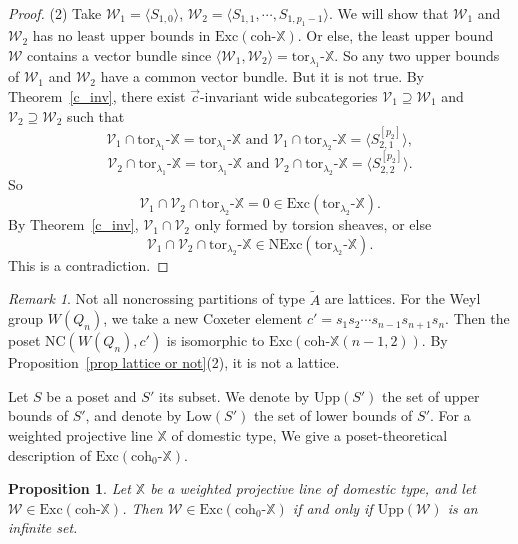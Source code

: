 \documentclass[a4paper, 11pt, reqno]{amsart}
\numberwithin{equation}{section}
\newtheorem{prop}[thm]{Proposition}
\theoremstyle{remark}
\newtheorem{rmk}[thm]{Remark}
\theoremstyle{definition}
\begin{document}
\begin{proof}
   (2) Take $\mathcal W_1=\langle S_{1,0} \rangle$, $\mathcal W_2=\langle S_{1,1},\cdots,S_{1,p_1-1} \rangle$. We will show that $\mathcal W_1$ and $\mathcal W_2$ has no least upper bounds in $\mathrm{Exc}(\mathrm{coh} \text{-} \mathbb X)$. Or else, the least upper bound $\mathcal W$ contains a vector bundle since $\langle \mathcal W_1, \mathcal W_2 \rangle=\mathrm{tor}_{\lambda_1} \text{-} \mathbb X$. So any two upper bounds of $\mathcal W_1$ and $\mathcal W_2$ have a common vector bundle. But it is not true. By Theorem~\ref{c_inv}, there exist $\vec c$-invariant wide subcategories $\mathcal V_1 \supseteq \mathcal W_1$ and $\mathcal V_2 \supseteq \mathcal W_2$ such that 
   \[
        \mathcal V_1 \cap \mathrm{tor}_{\lambda_1} \text{-} \mathbb X=\mathrm{tor}_{\lambda_1} \text{-} \mathbb X \text{\ \ and \ \ } \mathcal V_1 \cap \mathrm{tor}_{\lambda_2}\text{-} \mathbb X=\langle S_{2,1}^{[p_2]} \rangle,
   \]
   \[
        \mathcal V_2 \cap \mathrm{tor}_{\lambda_1} \text{-} \mathbb X=\mathrm{tor}_{\lambda_1} \text{-} \mathbb X \text{\ \ and \ \ } \mathcal V_2 \cap \mathrm{tor}_{\lambda_2}\text{-} \mathbb X=\langle S_{2,2}^{[p_2]} \rangle.
   \]
   So 
   \[
      \mathcal V_1 \cap \mathcal V_2 \cap \mathrm{tor}_{\lambda_2}\text{-} \mathbb X=0 \in \mathrm{Exc}(\mathrm{tor}_{\lambda_2}\text{-} \mathbb X).
   \]
   By Theorem~\ref{c_inv}, $\mathcal V_1 \cap \mathcal V_2$ only formed by torsion sheaves, or else 
   \[
      \mathcal V_1 \cap \mathcal V_2 \cap \mathrm{tor}_{\lambda_2}\text{-} \mathbb X \in \mathrm{NExc}(\mathrm{tor}_{\lambda_2}\text{-} \mathbb X).
   \]
   This is a contradiction. 
\end{proof}

\begin{rmk}
   Not all noncrossing partitions of type $\tilde A$ are lattices. For the Weyl group $W(Q_n)$, we take a new Coxeter element $c'=s_1 s_2 \cdots s_{n-1} s_{n+1} s_n$. Then the poset $\mathrm{NC}(W(Q_n),c')$ is isomorphic to $\mathrm{Exc}(\mathrm{coh} \text{-} \mathbb X(n-1,2))$. By Proposition~\ref{prop lattice or not}(2), it is not a lattice.
\end{rmk}

Let $S$ be a poset and $S'$ its subset. We denote by $\mathrm{Upp}(S')$ the set of upper bounds of $S'$, and denote by $\mathrm{Low}(S')$ the set of lower bounds of $S'$. For a weighted projective line $\mathbb X$ of domestic type, We give a poset-theoretical description of $\mathrm{Exc}(\mathrm{coh}_0 \text{-} \mathbb X)$.

\begin{prop} \label{prop Exc(tor) poset-theoretical}
   Let $\mathbb X$ be a weighted projective line of domestic type, and let $\mathcal W \in \mathrm{Exc}(\mathrm{coh} \text{-} \mathbb X)$. Then $\mathcal W \in \mathrm{Exc}(\mathrm{coh}_0 \text{-} \mathbb X)$ if and only if $\mathrm{Upp}(\mathcal W)$ is an infinite set.
\end{prop}
\end{document}
